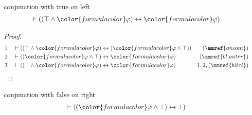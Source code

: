 \begin{lemma} conjunction with true on left
\begin{align}
\vdash ( ( \top \wedge {\color{formulacolor}\varphi} ) \leftrightarrow
    {\color{formulacolor}\varphi} )\label{bl.antrl}
\end{align}
\end{lemma}

\begin{proof}
\begin{align}
  1 && & \vdash ( ( \top \wedge {\color{formulacolor}\varphi} ) \leftrightarrow
      ( {\color{formulacolor}\varphi} \wedge \top )
      )&(\mmref{ancom})\notag
  \\ 2 && & \vdash ( ( {\color{formulacolor}\varphi} \wedge \top )
      \leftrightarrow {\color{formulacolor}\varphi}
      )&(\mmref{bl.antrr})\notag
  \\ 3 && & \vdash ( ( \top \wedge {\color{formulacolor}\varphi} )
      \leftrightarrow {\color{formulacolor}\varphi}
      )&1,2,(\mmref{bitri})\notag
\end{align}
\end{proof}

\begin{lemma} conjunction with false on right
\begin{align}
\vdash ( ( {\color{formulacolor}\varphi} \wedge \bot ) \leftrightarrow \bot
    )\label{bl.anfar}
\end{align}
\end{lemma}

